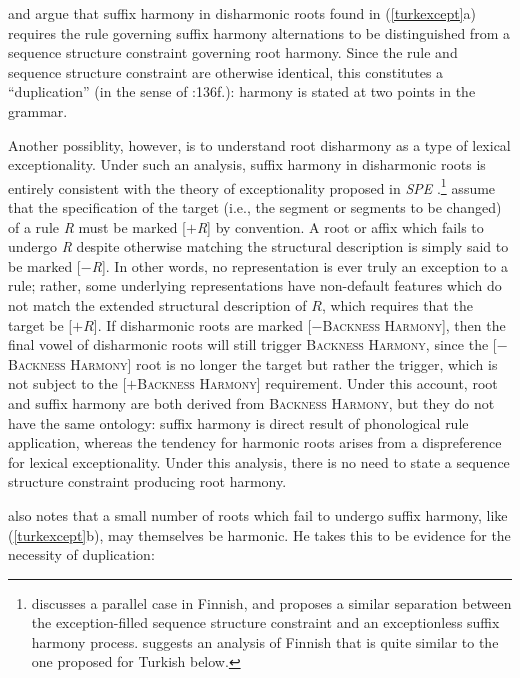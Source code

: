 \citet[212]{A74} and \citet{Iverson1978} argue that suffix harmony in disharmonic roots found in (\ref{turkexcept}a) requires the rule governing suffix harmony alternations to be distinguished from a sequence structure constraint governing root harmony. 
Since the rule and sequence structure constraint are otherwise identical, this constitutes a ``duplication'' (in the sense of \citealt{KK77}:136f.): harmony is stated at two points in the grammar.

Another possiblity, however, is to understand root disharmony as a type of lexical exceptionality.
Under such an analysis, suffix harmony in disharmonic roots is entirely consistent with the theory of exceptionality proposed in \emph{SPE} \citep[197f.]{Zonneveld1978}.\footnote{
    \citet[29f.]{Kiparsky1968} discusses a parallel case in Finnish, and proposes a similar separation between the exception-filled sequence structure constraint and an exceptionless suffix harmony process.
    \citet[171f.]{Howard1972} suggests an analysis of Finnish that is quite similar to the one proposed for Turkish below.}
\citeauthor{SPE} assume that the specification of the target (i.e., the segment or segments to be changed) of a rule \emph{R} must be marked [$+$\emph{R}] by convention.
A root or affix which fails to undergo \emph{R} despite otherwise matching the structural description is simply said to be marked [$-$\emph{R}]. 
In other words, no representation is ever truly an exception to a rule; rather, some underlying representations have non-default features which do not match the extended structural description of $R$, which requires that the target be [$+R$].
If disharmonic roots are marked [$-$\textsc{Backness Harmony}], then the final vowel of disharmonic roots will still trigger \textsc{Backness Harmony}, since the [$-$\textsc{Backness Harmony}] root is no longer the target but rather the trigger, which is not subject to the [$+$\textsc{Backness Harmony}] requirement.
Under this account, root and suffix harmony are both derived from \textsc{Backness Harmony}, but they do not have the same ontology: suffix harmony is direct result of phonological rule application, whereas the tendency for harmonic roots arises from a dispreference for lexical exceptionality.
Under this analysis, there is no need to state a sequence structure constraint producing root harmony.

\citeauthor{A74} also notes that a small number of roots which fail to undergo suffix harmony, like (\ref{turkexcept}b), may themselves be harmonic.
He takes this to be evidence for the necessity of duplication:

